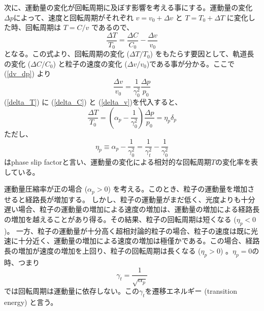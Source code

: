 \documentclass[10pt,a4paper]{ltjsarticle}
\begin{document}
次に、運動量の変化が回転周期に及ぼす影響を考える事にする。運動量の変化$\Delta p$によって、速度と回転周期がそれぞれ $v=v_0+\Delta v$ と $T=T_0+\Delta T$ に変化した時、回転周期は $T=C/v$ であるので、
%
\begin{equation}
    \frac{\Delta T}{T_0} = \frac{\Delta C}{C_0} - \frac{\Delta v}{v_0}
    \label{delta_T}
\end{equation}
%
となる。この式より、回転周期の変化 ($\Delta T/T_0$) をもたらす要因として、軌道長の変化 ($\Delta C/C_0$) と粒子の速度の変化 ($\Delta v/v_0$)である事が分かる。ここで(\ref{dv_dp}) より
%
\begin{equation}
    \frac{\Delta v}{v_0}=\frac{1}{\gamma_0^2}\frac{\Delta p}{p_0}
    \label{delta_v}
\end{equation}
%
(\ref{delta_T}) に (\ref{delta_C}) と (\ref{delta_v})を代入すると、
%
\begin{equation}
    \frac{\Delta T}{T_0} = \left(\alpha_p - \frac{1}{\gamma_0^2}\right)\frac{\Delta p}{p_0} = \eta_p \delta_p
\end{equation}
%
ただし、
%
\begin{equation}
    \eta_p \equiv \alpha_p - \frac{1}{\gamma_0^2} = \frac{1}{\gamma_t^2} - \frac{1}{\gamma_0^2}
    \label{alppha_slip}
\end{equation}
%
はphase slip factorと言い、運動量の変化による相対的な回転周期$T$の変化率を表している。
%

運動量圧縮率が正の場合 ($\alpha_p>0$) を考える。このとき、粒子の運動量を増加させると経路長が増加する。 しかし、粒子の運動量がまだ低く、光度よりも十分遅い場合、粒子の運動量の増加による速度の増加は、運動量の増加による経路長の増加を越えることがあり得る。その結果、粒子の回転周期は短くなる ($\eta_p < 0$)。
一方、粒子の運動量が十分高く超相対論的粒子の場合、粒子の速度は既に光速に十分近く、運動量の増加による速度の増加は極僅かである。この場合、経路長の増加が速度の増加を上回り、粒子の回転周期は長くなる ($\eta_p>0$) 。$\eta_p = 0$の時、つまり
%
\begin{equation}
    \gamma_t = \frac{1}{\sqrt{\alpha_p}}
\end{equation}
%
では回転周期は運動量に依存しない。この$\gamma_t$を遷移エネルギー (transition energy) と言う。

\vspace{\baselineskip}
\end{document}

